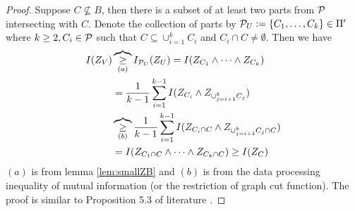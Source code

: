 \begin{proof}
\ifshowNonSelf
	Suppose $C \not\subseteq B$, then there is a subset of at least two parts from $\P$ intersecting with $C$. Denote the collection of parts by $\P_U :=\{C_1, \dots, C_k\} \in \Pi'$ where 
	$k \geq 2, C_i \in \P $ such that $C \subseteq \cup_{i=1}^k C_i$ and $C_i \cap C \neq \emptyset$.
	Then we have
\begin{align*}
	I(Z_V) & \overbrace{\geq}_{(a)} I_{\P_U}(Z_U)  = I(Z_{C_1} \wedge \dots \wedge Z_{C_k})\\
	& = {1\over k-1}\sum_{i=1}^{k-1} I(Z_{C_i} \wedge Z_{\cup_{j=i+1}^k C_j}) \\
	& \overbrace{\geq}_{(b)} \frac{1}{k-1}\sum_{i=1}^{k-1} I(Z_{C_i \cap C} \wedge Z_{\cup_{j=i+1}^k C_j \cap C}) \\
	& = I(Z_{C_1 \cap C} \wedge \dots \wedge Z_{C_k \cap C}) \geq I(Z_C)
\end{align*}
$(a)$ is from lemma \ref{lem:smallZB} and $(b)$ is from the data processing inequality of mutual information (or the restriction of graph cut function).
\else
The proof is similar to Proposition 5.3 of literature \cite{ska}.
\fi
\end{proof}
